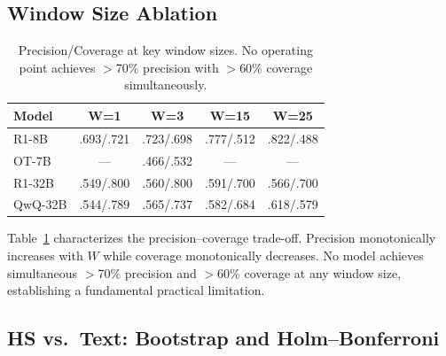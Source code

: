 \documentclass[11pt]{article}
\begin{document}
\subsection{Window Size Ablation}
\label{sec:window_ablation}

\begin{table}[t]
\centering
\small
\begin{tabular}{@{}lcccc@{}}
\toprule
\textbf{Model} & \textbf{W=1} & \textbf{W=3} & \textbf{W=15} & \textbf{W=25} \\
\midrule
R1-8B & .693/.721 & .723/.698 & .777/.512 & .822/.488 \\
OT-7B & --- & .466/.532 & --- & --- \\
R1-32B & .549/.800 & .560/.800 & .591/.700 & .566/.700 \\
QwQ-32B & .544/.789 & .565/.737 & .582/.684 & .618/.579 \\
\bottomrule
\end{tabular}
\caption{Precision/Coverage at key window sizes. No operating point achieves $>$70\% precision with $>$60\% coverage simultaneously.}
\label{tab:prec_cov}
\end{table}

Table~\ref{tab:prec_cov} characterizes the precision--coverage trade-off.
Precision monotonically increases with $W$ while coverage monotonically decreases.
No model achieves simultaneous $>$70\% precision and $>$60\% coverage at any window size, establishing a fundamental practical limitation.

\subsection{HS vs.\ Text: Bootstrap and Holm--Bonferroni}
\label{sec:hs_vs_text}
\end{document}
